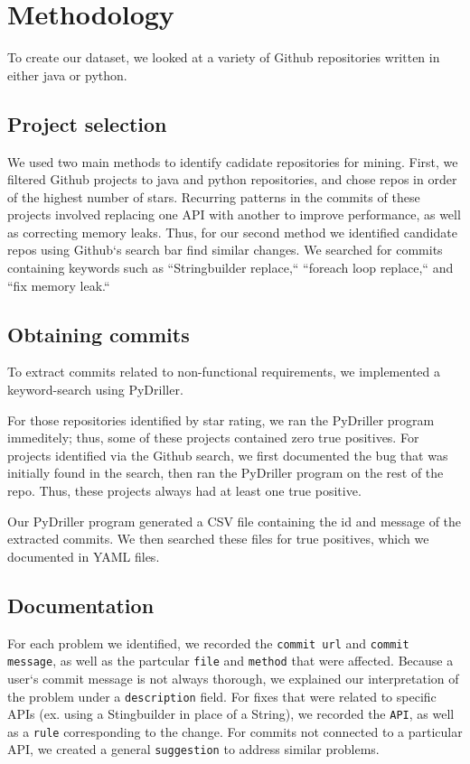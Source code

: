 \documentclass[sigconf]{acmart}
\begin{document}
\section{Methodology}


To create our dataset, we looked at a variety of Github repositories written in either java or python. 


\subsection {Project selection}
We used two main methods to identify cadidate repositories for mining. 
First, we filtered Github projects to java and python repositories, and chose repos in order of the highest number of stars. Recurring patterns in the commits of these projects involved replacing one API with another to improve performance, as well as correcting memory leaks. Thus, for our second method we identified candidate repos using Github`s search bar find similar changes. We searched for commits containing keywords such as ``Stringbuilder replace,`` ``foreach loop replace,`` and ``fix memory leak.``

\subsection{Obtaining commits}
To extract commits related to non-functional requirements, we implemented a keyword-search using PyDriller. 

For those repositories identified by star rating, we ran the PyDriller program immeditely; thus, some of these projects contained zero true positives. For projects identified via the Github search, we first documented the bug that was initially found in the search, then ran the PyDriller program on the rest of the repo. Thus, these projects always had at least one true positive. 

Our PyDriller program generated a CSV file containing the id and message of the extracted commits. We then searched these files for true positives, which we documented in YAML files. 

\subsection{Documentation}
For each problem we identified, we recorded the \texttt{commit url} and \texttt{commit message}, as well as the partcular \texttt{file} and \texttt{method} that were affected. Because a user`s commit message is not always thorough, we explained our interpretation of the problem under a \texttt{description} field. For fixes that were related to specific APIs (ex. using a Stingbuilder in place of  a String), we recorded the \texttt{API}, as well as a \texttt{rule} corresponding to the change. For commits not connected to a particular API, we created a general \texttt{suggestion} to address similar problems.
\end{document}
